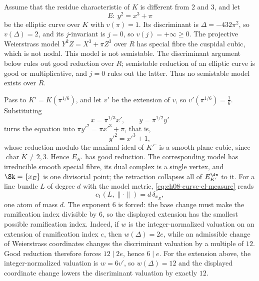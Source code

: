 \begin{example}
\label{ex:ch08-potentially-good}
Assume that the residue characteristic of $K$ is different from $2$ and $3$,
and let
\[
 E:\ y^2=x^3+\pi
\]
be the elliptic curve over $K$ with $v(\pi)=1$.  Its discriminant is
$\Delta=-432\pi^2$, so $v(\Delta)=2$, and its $j$-invariant is $j=0$, so
$v(j)=+\infty\geq0$.  The projective Weierstrass model $Y^2Z=X^3+\pi Z^3$ over $R$ has
special fibre the cuspidal cubic, which is not nodal.  This model is not
semistable.  The discriminant argument below rules out good reduction over
$R$; semistable reduction of an elliptic curve is good or multiplicative,
and $j=0$ rules out the latter.  Thus no semistable model exists over $R$.

Pass to $K'=K(\pi^{1/6})$, and let $v'$ be the extension of $v$, so
$v'(\pi^{1/6})=\tfrac16$.  Substituting
\[
 x=\pi^{1/3}x',\qquad y=\pi^{1/2}y'
\]
turns the equation into $\pi y'^2=\pi x'^3+\pi$, that is,
\[
 y'^2=x'^3+1 ,
\]
whose reduction modulo the maximal ideal of $K'^\circ$ is a smooth plane
cubic, since $\operatorname{char}\widetilde K\neq2,3$.  Hence $E_{K'}$ has
good reduction.  The corresponding model has irreducible smooth special
fibre, its dual complex is a single vertex, and
$\Sk=\{x_{E}\}$ is one divisorial point; the retraction collapses all of
$E_{K'}^{\An}$ to it.  For a line bundle $L$ of degree $d$ with the model
metric, \eqref{eq:ch08-curve-cl-measure} reads
\[
 c_1(L,\|\cdot\|)=d\,\delta_{x_E} ,
\]
one atom of mass $d$.  The exponent $6$ is forced: the base change must make
the ramification index divisible by $6$, so the displayed extension has the
smallest possible ramification index.  Indeed, if $w$ is the
integer-normalized valuation on an extension of ramification index $e$, then
$w(\Delta)=2e$, while an admissible change of Weierstrass coordinates changes
the discriminant valuation by a multiple of $12$.  Good reduction therefore
forces $12\mid2e$, hence $6\mid e$.  For the extension above, the
integer-normalized valuation is $w=6v'$, so $w(\Delta)=12$ and the displayed
coordinate change lowers the discriminant valuation by exactly $12$.
\end{example}

